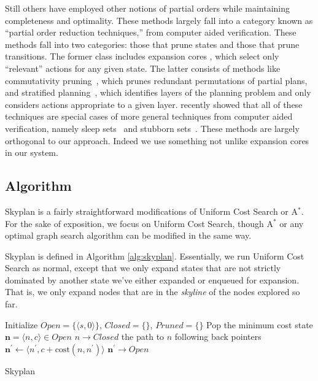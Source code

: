 \documentclass[letterpaper]{article}
\theoremstyle{plain} \newtheorem{theorem}{Theorem} \newtheorem{proposition}{Proposition} \newtheorem{lemma}{Lemma}
\theoremstyle{definition} \newtheorem{definition}{Definition} \newtheorem{conjecture}{Conjecture} \newtheorem*{example}{Example}
\theoremstyle{remark} \newtheorem*{remark}{Remark} \newtheorem*{note}{Note} \newtheorem{case}{Case}
\begin{document}
Still others have employed other notions of partial orders while
maintaining completeness and optimality. These methods largely fall
into a category known as ``partial order reduction techniques,''
from computer aided verification. These methods fall into two
categories: those that prune states and those that prune transitions.
The former class includes expansion cores \cite{chen09completeness,
xu11theory}, which select only ``relevant'' actions for any given
state. The latter consists of methods like commutativity
pruning~\cite{geffner2000admissible}, which prunes redundant
permutations of partial plans, and stratified
planning~\cite{chen2009stratified}, which identifies layers of the
planning problem and only considers actions appropriate to a given
layer. \citet{wehrle2012partial} recently showed that all of these
techniques are special cases of more general techniques from computer
aided verification, namely sleep sets~\cite{godefroid96partial} and
stubborn sets~\cite{valmari92stubborn}. These methods are largely
orthogonal to our approach. Indeed we use something not unlike
expansion cores in our system.


\subsection{Algorithm}

Skyplan is a fairly straightforward modifications of Uniform
Cost Search or A$^*$. For the sake of exposition, we focus on Uniform Cost
Search, though A$^*$ or any optimal graph search algorithm can
be modified in the same way.

Skyplan is defined in Algorithm \ref{alg:skyplan}. Essentially, we run Uniform Cost Search as normal, except that 
we only expand states that are not strictly dominated by another
state we've either expanded or enqueued for expansion. That is, we only expand nodes that are in the \textit{skyline}
of the nodes explored so far.

\begin{algorithm}
  \begin{algorithmic}[1]
    \State Initialize $Open=\{\langle s,0\rangle\}$, $Closed=\{\}$, $Pruned=\{\}$
    \State Pop the minimum cost state $\mathbf{n} = \langle n,c\rangle\in Open$
      \State $n\rightarrow Closed$
        \State \Return the path to $n$ following back pointers
      \EndIf
      \State $\mathbf{n^\prime} \gets \langle n^\prime,c+\mathrm{cost}(n,n^\prime)\rangle$
        \State $\mathbf{n^\prime} \rightarrow Open$
        \EndIf
      \EndFor
    \EndWhile
  \EndProcedure
  \end{algorithmic}
\caption{Skyplan}
\label{alg:skyplan}
\end{algorithm}
\end{document}
